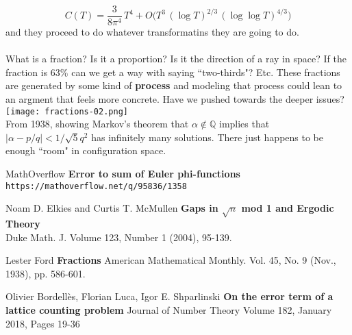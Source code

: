 \documentclass[12pt]{article}
\begin{document}
$$ C(T) = \frac{3}{8 \pi^4 }\, T^4 + O\big(T^3 \, (\log T)^{2/3} \,(\log \log T)^{4/3} \big) $$ 
and they proceed to do whatever transformatins they are going to do.  \\ \\
What is a fraction?   Is it a proportion? Is it the direction of a ray in space?  If the fraction is 63\% can we get a way with saying ``two-thirds"?  Etc.  These fractions are generated by some kind of \textbf{process} and modeling that process could lean to an argment that feels more concrete. Have we pushed towards the deeper issues?\\
\texttt{[image: fractions-02.png]} \\
From 1938, showing Markov's theorem that $\alpha \notin \mathbb{Q}$ implies that $|\alpha - p/q| < 1/\sqrt{5}q^2 $ has infinitely many solutions.  There just happens to be enough ``room" in configuration space.

\vfill

\begin{thebibliography}{}

\item MathOverflow \textbf{Error to sum of Euler phi-functions} \texttt{https://mathoverflow.net/q/95836/1358}

\item Noam D. Elkies and Curtis T. McMullen \textbf{Gaps in $\sqrt{n}$ mod 1 and Ergodic Theory} \\ Duke Math. J. Volume 123, Number 1 (2004), 95-139.

\item Lester Ford \textbf{Fractions} American Mathematical Monthly. Vol. 45, No. 9 (Nov., 1938), pp. 586-601. 

\item Olivier Bordell\`{e}s, Florian Luca, Igor E. Shparlinski \textbf{On the error term of a lattice counting problem} Journal of Number Theory Volume 182, January 2018, Pages 19-36
\end{thebibliography}
\end{document}

